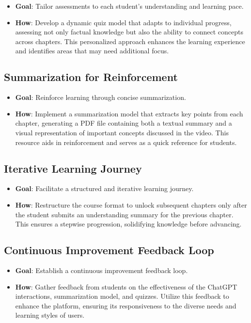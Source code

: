 \begin{itemize}[label=--]
	\item \textbf{Goal}: Tailor assessments to each student's understanding and learning pace.
	\item \textbf{How}: Develop a dynamic quiz model that adapts to individual progress, assessing not only factual knowledge but also the ability to connect concepts across chapters. This personalized approach enhances the learning experience and identifies areas that may need additional focus.
\end{itemize}

\subsection{Summarization for Reinforcement}

\begin{itemize}[label=--]
	\item \textbf{Goal}: Reinforce learning through concise summarization.
	\item \textbf{How}: Implement a summarization model that extracts key points from each chapter, generating a PDF file containing both a textual summary and a visual representation of important concepts discussed in the video. This resource aids in reinforcement and serves as a quick reference for students.
\end{itemize}

\subsection{Iterative Learning Journey}

\begin{itemize}[label=--]
	\item \textbf{Goal}: Facilitate a structured and iterative learning journey.
	\item \textbf{How}: Restructure the course format to unlock subsequent chapters only after the student submits an understanding summary for the previous chapter. This ensures a stepwise progression, solidifying knowledge before advancing.
\end{itemize}

\subsection{Continuous Improvement Feedback Loop}

\begin{itemize}[label=--]
	\item \textbf{Goal}: Establish a continuous improvement feedback loop.
	\item \textbf{How}: Gather feedback from students on the effectiveness of the ChatGPT interactions, summarization model, and quizzes. Utilize this feedback to enhance the platform, ensuring its responsiveness to the diverse needs and learning styles of users.
\end{itemize}

